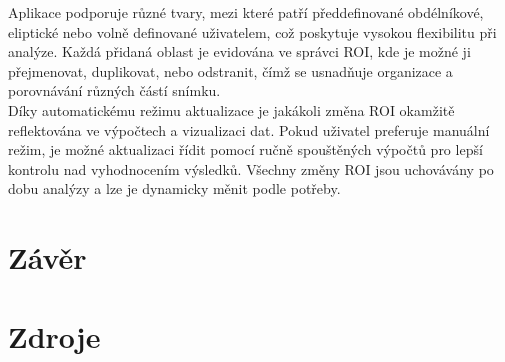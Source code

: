 \documentclass{article}
\begin{document}
Aplikace podporuje různé tvary, mezi které patří předdefinované obdélníkové, eliptické nebo volně definované uživatelem, což poskytuje vysokou flexibilitu při analýze. Každá přidaná oblast je evidována ve správci ROI, kde je možné ji přejmenovat, duplikovat, nebo odstranit, čímž se usnadňuje organizace a porovnávání různých částí snímku.\\

Díky automatickému režimu aktualizace je jakákoli změna ROI okamžitě reflektována ve výpočtech a vizualizaci dat. Pokud uživatel preferuje manuální režim, je možné aktualizaci řídit pomocí ručně spouštěných výpočtů pro lepší kontrolu nad vyhodnocením výsledků. Všechny změny ROI jsou uchovávány po dobu analýzy a lze je dynamicky měnit podle potřeby.





\section{Závěr}

\section{Zdroje}

\printbibliography
\end{document}

